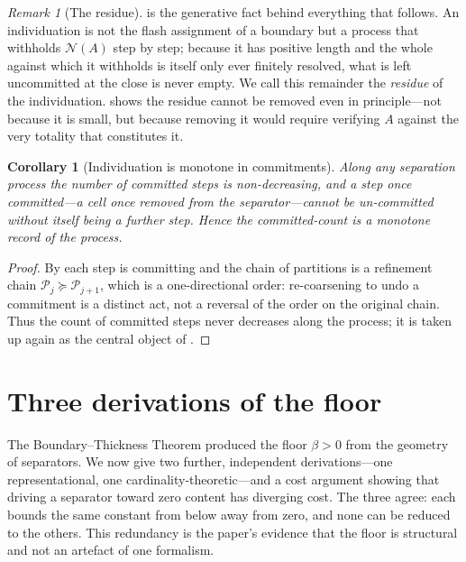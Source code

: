 \documentclass[11pt,a4paper]{article}
\theoremstyle{thmstyle}
\newtheorem{corollary}[theorem]{Corollary}
\theoremstyle{definition}
\theoremstyle{remark}
\newtheorem{remark}[theorem]{Remark}
\newcommand{\thick}{\beta}
\newcommand{\Part}{\mathscr{P}}
\newcommand{\Neg}{\mathcal{N}}
\begin{document}
\begin{remark}[The residue]
\label{rem:residue-origin}
 is the generative fact behind everything that follows. An
individuation is not the flash assignment of a boundary but a process that
withholds $\Neg(A)$ step by step; because it has positive length and the whole
against which it withholds is itself only ever finitely resolved, what is left
uncommitted at the close is never empty. We call this remainder the
\emph{residue} of the individuation.  shows the residue cannot
be removed even in principle---not because it is small, but because removing it
would require verifying $A$ against the very totality that constitutes it.
\end{remark}

\begin{corollary}[Individuation is monotone in commitments]
\label{cor:monotone-commit}
Along any separation process the number of committed steps is non-decreasing, and
a step once committed---a cell once removed from the separator---cannot be
un-committed without itself being a further step. Hence the committed-count is a
monotone record of the process.
\end{corollary}

\begin{proof}
By  each step is committing and the chain of partitions is a
refinement chain $\Part_j\succeq\Part_{j+1}$, which is a one-directional order:
re-coarsening to undo a commitment is a distinct act, not a reversal of the
order on the original chain. Thus the count of committed steps never decreases
along the process; it is taken up again as the central object of
.
\end{proof}


\section{Three derivations of the floor}
\label{sec:floor}

The Boundary--Thickness Theorem produced the floor $\thick>0$ from the geometry
of separators. We now give two further, independent derivations---one
representational, one cardinality-theoretic---and a cost argument showing that
driving a separator toward zero content has diverging cost. The three agree:
each bounds the same constant from below away from zero, and none can be reduced
to the others. This redundancy is the paper's evidence that the floor is
structural and not an artefact of one formalism.
\end{document}
